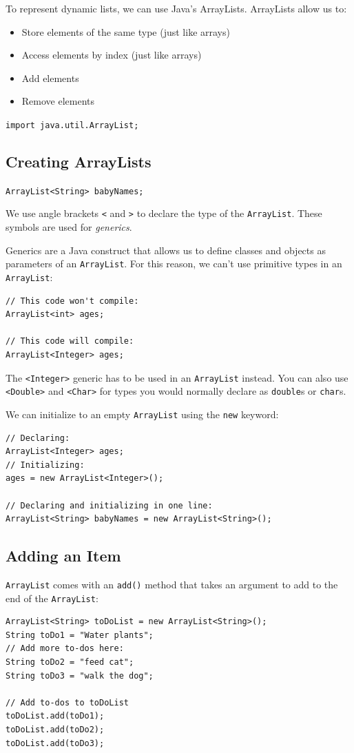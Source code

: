 \documentclass[a4paper, 12pt]{article}
\begin{document}
To represent dynamic lists, we can use Java's ArrayLists. ArrayLists allow us to:
\begin{itemize}
\item Store elements of the same type (just like arrays)

\item Access elements by index (just like arrays)

\item Add elements

\item Remove elements

\end{itemize}

\verb|import java.util.ArrayList;|

\subsection{Creating ArrayLists}
\verb|ArrayList<String> babyNames;|

We use angle brackets \verb|<| and \verb|>| to declare the type of the \verb|ArrayList|. These symbols are used for \textit{generics}.

Generics are a Java construct that allows us to define classes and objects as parameters of an \verb|ArrayList|. For this reason, we can't use primitive types in an \verb|ArrayList|:
\begin{verbatim}
// This code won't compile:
ArrayList<int> ages;

// This code will compile:
ArrayList<Integer> ages;
\end{verbatim}
The \verb|<Integer>| generic has to be used in an \verb|ArrayList| instead. You can also use \verb|<Double>| and \verb|<Char>| for types you would normally declare as \verb|double|s or \verb|char|s.

We can initialize to an empty \verb|ArrayList| using the \verb|new| keyword:
\begin{verbatim}
// Declaring:
ArrayList<Integer> ages;
// Initializing:
ages = new ArrayList<Integer>();

// Declaring and initializing in one line:
ArrayList<String> babyNames = new ArrayList<String>();
\end{verbatim}


\subsection{Adding an Item}
\verb|ArrayList| comes with an \verb|add()| method that takes an argument to add to the end of the \verb|ArrayList|:
\begin{verbatim}
ArrayList<String> toDoList = new ArrayList<String>();
String toDo1 = "Water plants";
// Add more to-dos here:
String toDo2 = "feed cat";
String toDo3 = "walk the dog";

// Add to-dos to toDoList
toDoList.add(toDo1);
toDoList.add(toDo2);
toDoList.add(toDo3);
\end{verbatim}
\end{document}
